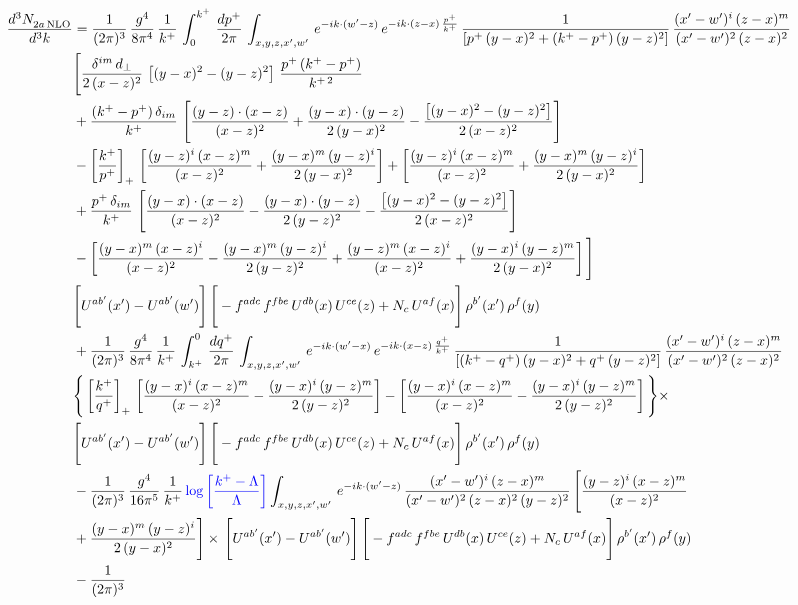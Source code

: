 \documentclass[9pt]{article}
\numberwithin{equation}{section}
\begin{document}
\begin{align}
    \frac{d^{3}N_{2a\,\rm NLO}^{\rm}}{d^{3}k}  & =  \frac{1}{(2\pi)^{3}}\, \frac{g^{4}}{8\pi^{4}}\,\frac{1}{k^{+}}\,\int_{0}^{k^{+}}\, \frac{dp^{+}}{2\pi}\,\int_{x,y,z,x',w'}\, e^{-ik\cdot(w'-z)}\,e^{-ik\cdot (z-x)\,\frac{p^{+}}{k^{+}}}\,\frac{1}{\left[p^{+}\,(y-x)^{2}+(k^{+}-p^{+})\,(y-z)^{2}\right]}\, \frac{(x'-w')^{i}\,(z-x)^{m}}{(x'-w')^{2}\,(z-x)^{2}} \notag \\ & \Bigg[\frac{\delta^{im}\,d_{\perp}}{2\,(x-z)^{2}}\,\left[(y-x)^{2}-(y-z)^{2}\right]\,\frac{p^{+}\,(k^{+}-p^{+})}{k^{+\,2}}\notag \\ & +\frac{(k^{+}-p^{+})\,\delta_{im}}{k^{+}}\,\left[\frac{(y-z)\cdot (x-z)}{(x-z)^{2}}+\frac{(y-x)\cdot (y-z)}{2\,(y-x)^{2}}-\frac{\left[(y-x)^{2}-(y-z)^{2}\right]}{2\,(x-z)^{2}}\right]\notag \\ & -\left[\frac{k^{+}}{p^{+}}\right]_{+}\,\left[\frac{(y-z)^{i}\,(x-z)^{m}}{(x-z)^{2}}+\frac{(y-x)^{m}\,(y-z)^{i}}{2\,(y-x)^{2}}\right]+ \left[\frac{(y-z)^{i}\,(x-z)^{m}}{(x-z)^{2}}+\frac{(y-x)^{m}\,(y-z)^{i}}{2\,(y-x)^{2}}\right]\notag \\ & +\frac{p^{+}\,\delta_{im}}{k^{+}}\,\left[\frac{(y-x)\cdot (x-z)}{(x-z)^{2}}-\frac{(y-x)\cdot (y-z)}{2\,(y-z)^{2}}-\frac{\left[(y-x)^{2}-(y-z)^{2}\right]}{2\,(x-z)^{2}}\right]\notag \\ &-\left[\frac{(y-x)^{m}\,(x-z)^{i}}{(x-z)^{2}}-\frac{(y-x)^{m}\,(y-z)^{i}}{2\,(y-z)^{2}}+\frac{(y-z)^{m}\,(x-z)^{i}}{(x-z)^{2}}+\frac{(y-x)^{i}\,(y-z)^{m}}{2\,(y-x)^{2}}\right]\Bigg] \notag \\ & \Bigg[U^{ab'}(x')-U^{ab'}(w')\Bigg]\,\Bigg[-f^{adc}\,f^{fbe}\,U^{db}(x)\,U^{ce}(z)+N_{c}\,U^{af}(x)\Bigg]\,\rho^{b'}(x')\,\rho^{f}(y)\notag \\ & + \frac{1}{(2\pi)^{3}}\,\frac{g^{4}}{8\pi^{4}}\,\frac{1}{k^{+}}\, \int^{0}_{k^{+}}\, \frac{dq^{+}}{2\pi} \,  \int_{x,y,z,x',w'}\,e^{-ik\cdot(w'-x)}\,e^{-ik\cdot (x-z)\,\frac{q^{+}}{k^{+}}}\,\frac{1}{\left[(k^{+}-q^{+})\,(y-x)^{2}+q^{+}\,(y-z)^{2}\right]}\, \frac{(x'-w')^{i}\,(z-x)^{m}}{(x'-w')^{2}\,(z-x)^{2}} \notag \\ &\Bigg\{\left[\frac{k^{+}}{q^{+}}\right]_{+}\,\left[\frac{(y-x)^{i}\,(x-z)^{m}}{(x-z)^{2}}-\frac{(y-x)^{i}\,(y-z)^{m}}{2\,(y-z)^{2}}\right] -\left[\frac{(y-x)^{i}\,(x-z)^{m}}{(x-z)^{2}}-\frac{(y-x)^{i}\,(y-z)^{m}}{2\,(y-z)^{2}}\right]\Bigg\}\times\,\notag \\ & \Bigg[U^{ab'}(x')-U^{ab'}(w')\Bigg]\,\Bigg[-f^{adc}\,f^{fbe}\,U^{db}(x)\,U^{ce}(z)+N_{c}\,U^{af}(x)\Bigg]\,\rho^{b'}(x')\,\rho^{f}(y)\notag \\ & - \frac{1}{(2\pi)^{3}}\, \frac{g^{4}}{16\pi^{5}}\,\frac{1}{k^{+}}\,{\color{blue}\log{\left[\frac{k^{+}-\Lambda}{\Lambda}\right]}} \int_{x,y,z,x',w'}\,e^{-ik\cdot(w'-z)}\, \frac{(x'-w')^{i}\,(z-x)^{m}}{(x'-w')^{2}\,(z-x)^{2}\, (y-z)^{2}}\,\Bigg[\frac{(y-z)^{i}\,(x-z)^{m}}{(x-z)^{2}}\notag \\ & +\frac{(y-x)^{m}\,(y-z)^{i}}{2\,(y-x)^{2}}\Bigg]\times\, \Bigg[U^{ab'}(x')-U^{ab'}(w')\Bigg]\,\Bigg[-f^{adc}\,f^{fbe}\,U^{db}(x)\,U^{ce}(z)+N_{c}\,U^{af}(x)\Bigg]\,\rho^{b'}(x')\,\rho^{f}(y)\notag \\ & - \frac{1}{(2\pi)^{3}}\, 
\end{align}
\end{document}
